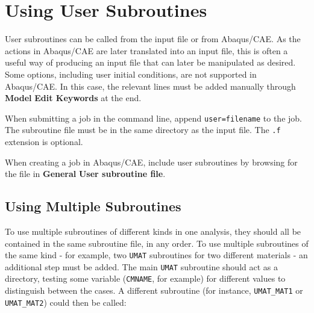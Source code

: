 \documentclass[10pt,letterpaper,oneside]{report}
\begin{document}









\section{Using User Subroutines}
User subroutines can be called from the input file or from Abaqus/CAE.  As the actions in Abaqus/CAE are later translated into an input file, this is often a useful way of producing an input file that can later be manipulated as desired. Some options, including user initial conditions, are not supported in Abaqus/CAE.  In this case, the relevant lines must be added manually through \textbf{Model} \textrightarrow \textbf{Edit Keywords} at the end.

When submitting a job in the command line, append \texttt{user=filename} to the job.  The subroutine file must be in the same directory as the input file.  The \texttt{.f} extension is optional.  

When creating a job in Abaqus/CAE, include user subroutines by browsing for the file in \textbf{General} \textrightarrow \textbf{User subroutine file}.


\subsection{Using Multiple Subroutines}
\label{subsec:multiple}
To use multiple subroutines of different kinds in one analysis, they should all be contained in the same subroutine file, in any order.  To use multiple subroutines of the same kind - for example, two \texttt{UMAT} subroutines for two different materials - an additional step must be added.  The main \texttt{UMAT} subroutine should act as a directory, testing some variable (\texttt{CMNAME}, for example) for different values to distinguish between the cases.  A different subroutine (for instance, \texttt{UMAT\_MAT1} or \texttt{UMAT\_MAT2}) could then be called:
\end{document}
